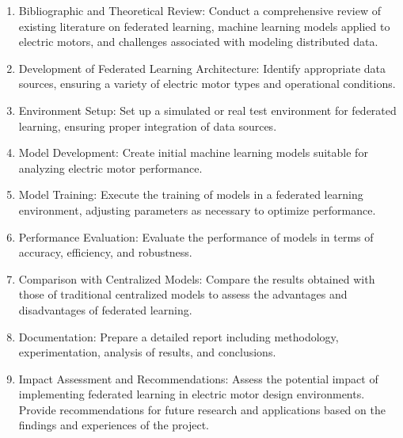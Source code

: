 \documentclass{article}
\begin{document}
\begin{enumerate}
    
\item Bibliographic and Theoretical Review: Conduct a comprehensive review of existing literature on federated learning, machine learning models applied to electric motors, and challenges associated with modeling distributed data.

\item Development of Federated Learning Architecture: Identify appropriate data sources, ensuring a variety of electric motor types and operational conditions.

\item Environment Setup: Set up a simulated or real test environment for federated learning, ensuring proper integration of data sources.

\item Model Development: Create initial machine learning models suitable for analyzing electric motor performance.

\item Model Training: Execute the training of models in a federated learning environment, adjusting parameters as necessary to optimize performance.

\item Performance Evaluation: Evaluate the performance of models in terms of accuracy, efficiency, and robustness.

\item Comparison with Centralized Models: Compare the results obtained with those of traditional centralized models to assess the advantages and disadvantages of federated learning.

\item Documentation: Prepare a detailed report including methodology, experimentation, analysis of results, and conclusions.

\item Impact Assessment and Recommendations: Assess the potential impact of implementing federated learning in electric motor design environments. Provide recommendations for future research and applications based on the findings and experiences of the project.

\end{enumerate}





\end{document}
